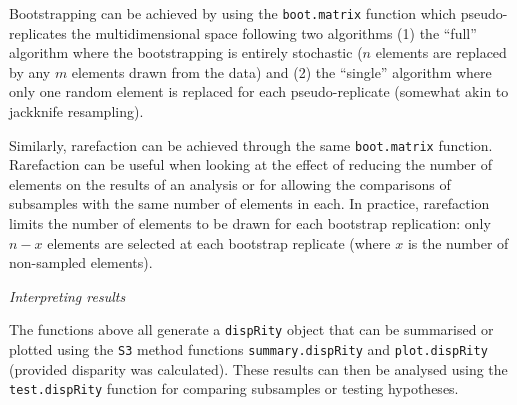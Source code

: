 \documentclass[12pt,letterpaper]{article}
\renewcommand{\subsection}[1]{%
\bigskip
\begin{center}
\begin{large}
\normalfont\itshape #1
\end{large}
\end{center}}
\newcommand{\disp}{\texttt{dispRity} }
\begin{document}
Bootstrapping can be achieved by using the \texttt{boot.matrix} function which pseudo-replicates the multidimensional space following two algorithms (1) the ``full'' algorithm where the bootstrapping is entirely stochastic ($n$ elements are replaced by any $m$ elements drawn from the data) and (2) the ``single'' algorithm where only one random element is replaced for each pseudo-replicate (somewhat akin to jackknife resampling).


Similarly, rarefaction can be achieved through the same \texttt{boot.matrix} function.
Rarefaction can be useful when looking at the effect of reducing the number of elements on the results of an analysis or for allowing the comparisons of subsamples with the same number of elements in each.
In practice, rarefaction limits the number of elements to be drawn for each bootstrap replication: only $n-x$ elements are selected at each bootstrap replicate (where $x$ is the number of non-sampled elements).

\subsection{Interpreting results}
The functions above all generate a \disp object that can be summarised or plotted using the \texttt{S3} method functions \texttt{summary.dispRity} and \texttt{plot.dispRity} (provided disparity was calculated).
These results can then be analysed using the \texttt{test.dispRity} function for comparing subsamples or testing hypotheses.
\end{document}
